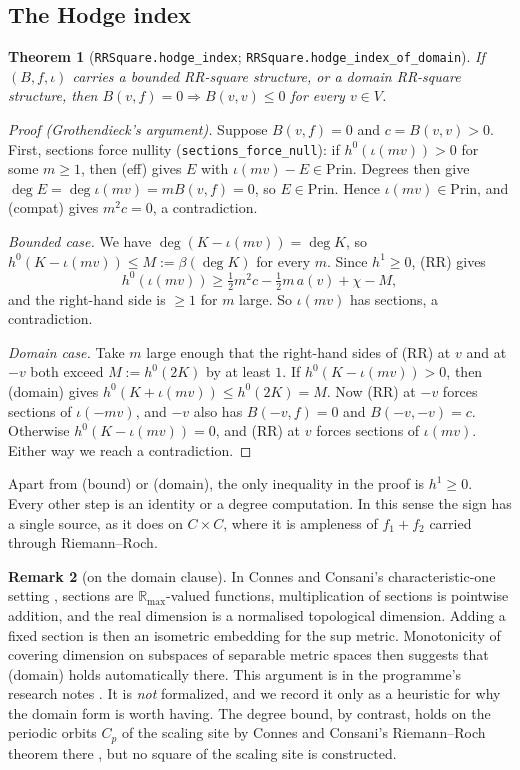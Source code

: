\documentclass[11pt]{article}
\newtheorem{theorem}{Theorem}
\theoremstyle{definition}
\newtheorem{remark}[theorem]{Remark}
\newcommand{\lean}[1]{\texttt{#1}}
\newcommand{\R}{\mathbb{R}}
\newcommand{\Prin}{\mathrm{Prin}}
\begin{document}
\subsection{The Hodge index}

\begin{theorem}[\lean{RRSquare.hodge\_index}; \lean{RRSquare.hodge\_index\_of\_domain}]\label{thm:hodge}
If $(B,f,\iota)$ carries a bounded RR-square structure, or a domain RR-square structure, then $B(v,f) = 0 \Rightarrow B(v,v) \le 0$ for every $v\in V$.
\end{theorem}

\begin{proof}[Proof (Grothendieck's argument)]
Suppose $B(v,f) = 0$ and $c = B(v,v) > 0$. First, sections force nullity (\lean{sections\_force\_null}): if $h^0(\iota(mv)) > 0$ for some $m \ge 1$, then (eff) gives $E$ with $\iota(mv) - E\in\Prin$. Degrees then give $\deg E = \deg \iota(mv) = m B(v,f) = 0$, so $E \in \Prin$. Hence $\iota(mv)\in\Prin$, and (compat) gives $m^2 c = 0$, a contradiction.

\emph{Bounded case.} We have $\deg(K - \iota(mv)) = \deg K$, so $h^0(K - \iota(mv)) \le M := \beta(\deg K)$ for every $m$. Since $h^1 \ge 0$, (RR) gives
\[
h^0(\iota(mv)) \ge \tfrac12 m^2 c - \tfrac12 m\,a(v) + \chi - M ,
\]
and the right-hand side is $\ge 1$ for $m$ large. So $\iota(mv)$ has sections, a contradiction.

\emph{Domain case.} Take $m$ large enough that the right-hand sides of (RR) at $v$ and at $-v$ both exceed $M := h^0(2K)$ by at least $1$. If $h^0(K - \iota(mv)) > 0$, then (domain) gives $h^0(K + \iota(mv)) \le h^0(2K) = M$. Now (RR) at $-v$ forces sections of $\iota(-mv)$, and $-v$ also has $B(-v,f) = 0$ and $B(-v,-v) = c$. Otherwise $h^0(K-\iota(mv)) = 0$, and (RR) at $v$ forces sections of $\iota(mv)$. Either way we reach a contradiction.
\end{proof}

Apart from (bound) or (domain), the only inequality in the proof is $h^1 \ge 0$. Every other step is an identity or a degree computation. In this sense the sign has a single source, as it does on $C\times C$, where it is ampleness of $f_1+f_2$ carried through Riemann--Roch.

\begin{remark}[on the domain clause]
In Connes and Consani's characteristic-one setting \cite{CCScaling}, sections are $\R_{\max}$-valued functions, multiplication of sections is pointwise addition, and the real dimension is a normalised topological dimension. Adding a fixed section is then an isometric embedding for the sup metric. Monotonicity of covering dimension on subspaces of separable metric spaces \cite[Thms.~1.1.2, 1.7.7]{Engelking} then suggests that (domain) holds automatically there. This argument is in the programme's research notes \cite{Arda}. It is \emph{not} formalized, and we record it only as a heuristic for why the domain form is worth having. The degree bound, by contrast, holds on the periodic orbits $C_p$ of the scaling site by Connes and Consani's Riemann--Roch theorem there \cite{CCScaling}, but no square of the scaling site is constructed.
\end{remark}
\end{document}
